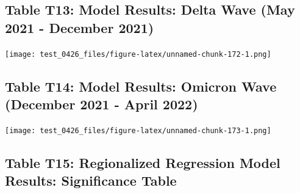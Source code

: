 \documentclass[
]{article}
\begin{document}
\hypertarget{table-t13-model-results-delta-wave-may-2021---december-2021}{%
\subsection{Table T13: Model Results: Delta Wave (May 2021 - December
2021)}\label{table-t13-model-results-delta-wave-may-2021---december-2021}}

\texttt{[image: test\_0426\_files/figure-latex/unnamed-chunk-172-1.png]}

\hypertarget{table-t14-model-results-omicron-wave-december-2021---april-2022}{%
\subsection{Table T14: Model Results: Omicron Wave (December 2021 -
April
2022)}\label{table-t14-model-results-omicron-wave-december-2021---april-2022}}

\texttt{[image: test\_0426\_files/figure-latex/unnamed-chunk-173-1.png]}

\newpage

\hypertarget{table-t15-regionalized-regression-model-results-significance-table}{%
\subsection{Table T15: Regionalized Regression Model Results:
Significance
Table}\label{table-t15-regionalized-regression-model-results-significance-table}}
\end{document}
